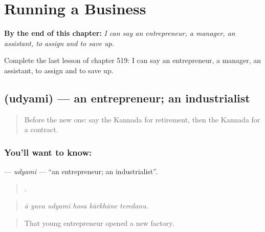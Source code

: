 
\chapter{Running a Business}
\label{ch:ka-running-a-business}

\begin{chapteropening}
\textbf{By the end of this chapter:} \emph{I can say an entrepreneur, a manager, an assistant, to assign and to save up.}

Complete the last lesson of chapter 519: I can say an entrepreneur, a manager, an assistant, to assign and to save up.
\end{chapteropening}

\section[\texorpdfstring{\kn{ಉದ್ಯಮಿ} (udyami)}{ಉದ್ಯಮಿ (udyami)}]{ (udyami) — an entrepreneur; an industrialist}

\label{lesson:KA-C519-udyami}



\begin{quote}
Before the new one: say the Kannada for retirement, then the Kannada for a contract.
\end{quote}

\subsection*{You'll want to know: }
\textbf{} — \emph{udyami} — \textquotedblleft{}an entrepreneur; an industrialist\textquotedblright{}.

\begin{quote}
     .
\end{quote}

\begin{quote}
\emph{ā yuva udyami hosa kārkhāne teredanu.}
\end{quote}

\begin{quote}
That young entrepreneur opened a new factory.
\end{quote}

